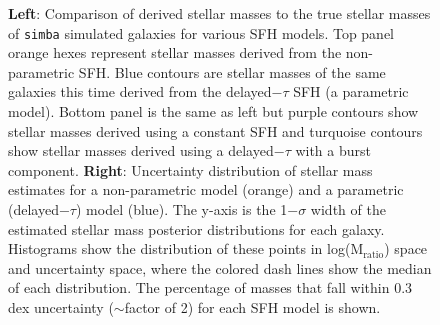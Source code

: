 \documentclass[twocolumn]{aastex62}
\begin{document}
\begin{figure}[!h]
  \centering
  \hfill
  \caption{\textbf{Left}: Comparison of derived stellar masses to the true stellar masses of \texttt{simba} simulated galaxies for various SFH models. Top panel orange hexes represent stellar masses derived from the non-parametric SFH. Blue contours are stellar masses of the same galaxies this time derived from the delayed$-\tau$ SFH (a parametric model). Bottom panel is the same as left but purple contours show stellar masses derived using a constant SFH and turquoise contours show stellar masses derived using a delayed$-\tau$ with a burst component. \textbf{Right}: Uncertainty distribution of stellar mass estimates for a non-parametric model (orange) and a parametric (delayed$-\tau$) model (blue). The y-axis is the 1$-\sigma$ width of the estimated stellar mass posterior distributions for each galaxy. Histograms show the distribution of these points in log(M$_{\mathrm{ratio}}$) space and uncertainty space, where the colored dash lines show the median of each distribution. The percentage of masses that fall within 0.3 dex uncertainty ($\sim$factor of 2) for each SFH model is shown.}
\label{fig:mass_comp}
\end{figure}
\end{document}

